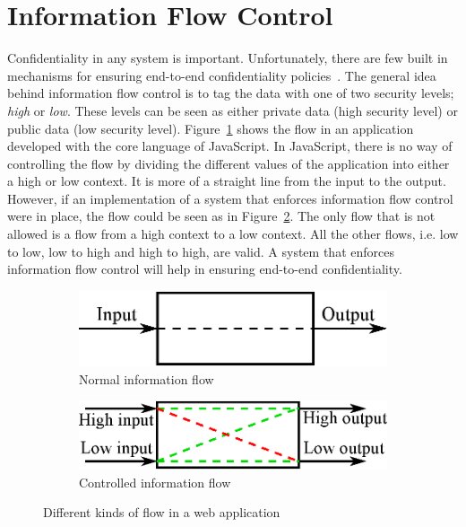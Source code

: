 \section{Information Flow Control}
Confidentiality in any system is important. Unfortunately, there are few built in mechanisms for ensuring end-to-end confidentiality policies~\cite{ifc-jsac}. The general idea behind information flow control is to tag the data with one of two security levels; \emph{high} or \emph{low}. These levels can be seen as either private data (high security level) or public data (low security level). Figure~\ref{fig:normal_flow} shows the flow in an application developed with the core language of JavaScript. In JavaScript, there is no way of controlling the flow by dividing the different values of the application into either a high or low context. It is more of a straight line from the input to the output. However, if an implementation of a system that enforces information flow control were in place, the flow could be seen as in Figure~\ref{fig:controlled_flow}. The only flow that is not allowed is a flow from a high context to a low context. All the other flows, i.e. low to low, low to high and high to high, are valid. A system that enforces information flow control will help in ensuring end-to-end confidentiality.
\begin{figure}[h]
  \begin{subfigure}{.5\textwidth}
    \includegraphics[scale=0.65]{images/flow_normal.eps}
    \caption{Normal information flow}
    \label{fig:normal_flow}
  \end{subfigure}
  \begin{subfigure}{.5\textwidth}
    \includegraphics[scale=0.65]{images/flow_controlled.eps}
    \caption{Controlled information flow}
    \label{fig:controlled_flow}
  \end{subfigure}
  \caption{Different kinds of flow in a web application}
  \label{fig:flows}
\end{figure}
